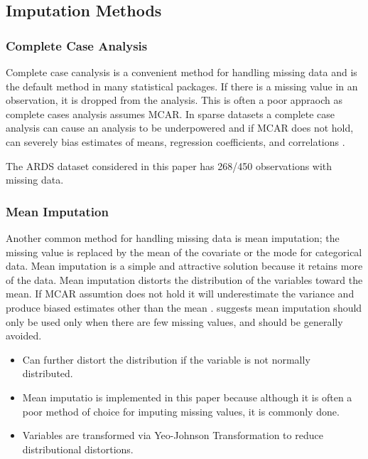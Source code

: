 \documentclass[12pt,]{article}
\providecommand{\tightlist}{%
  \setlength{\itemsep}{0pt}\setlength{\parskip}{0pt}}
\begin{document}
\subsection{Imputation Methods}\label{imputation-methods}

\subsubsection{Complete Case Analysis}\label{complete-case-analysis}

Complete case canalysis is a convenient method for handling missing data
and is the default method in many statistical packages. If there is a
missing value in an observation, it is dropped from the analysis. This
is often a poor appraoch as complete cases analysis assumes MCAR. In
sparse datasets a complete case analysis can cause an analysis to be
underpowered and if MCAR does not hold, can severely bias estimates of
means, regression coefficients, and correlations
\citep{van_buuren_flexible_2012}.

The ARDS dataset considered in this paper has 268/450 observations with
missing data.

\subsubsection{Mean Imputation}\label{mean-imputation}

Another common method for handling missing data is mean imputation; the
missing value is replaced by the mean of the covariate or the mode for
categorical data. Mean imputation is a simple and attractive solution
because it retains more of the data. Mean imputation distorts the
distribution of the variables toward the mean. If MCAR assumtion does
not hold it will underestimate the variance and produce biased estimates
other than the mean \citep{van_buuren_flexible_2012}.
\citep{van_buuren_flexible_2012} suggests mean imputation should only be
used only when there are few missing values, and should be generally
avoided.

\begin{itemize}
\tightlist
\item
  Can further distort the distribution if the variable is not normally
  distributed.\\
\item
  Mean imputatio is implemented in this paper because although it is
  often a poor method of choice for imputing missing values, it is
  commonly done.\\
\item
  Variables are transformed via Yeo-Johnson Transformation to reduce
  distributional distortions.
\end{itemize}
\end{document}

